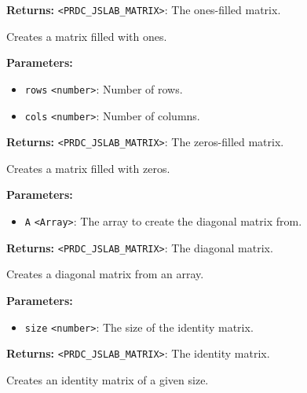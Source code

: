 \documentclass[12pt,a4paper]{article}
\begin{document}
\noindent \textbf{Returns:} \texttt{<PRDC\_JSLAB\_MATRIX>}: The ones-filled matrix.

\noindent Creates a matrix filled with ones.

\vspace{5mm}
\noindent {}


\noindent \textbf{Parameters:}
\begin{itemize}
  \item \texttt{rows} \texttt{<number>}: Number of rows.
  \item \texttt{cols} \texttt{<number>}: Number of columns.
\end{itemize}

\noindent \textbf{Returns:} \texttt{<PRDC\_JSLAB\_MATRIX>}: The zeros-filled matrix.

\noindent Creates a matrix filled with zeros.

\vspace{5mm}
\noindent {}


\noindent \textbf{Parameters:}
\begin{itemize}
  \item \texttt{A} \texttt{<Array>}: The array to create the diagonal matrix from.
\end{itemize}

\noindent \textbf{Returns:} \texttt{<PRDC\_JSLAB\_MATRIX>}: The diagonal matrix.

\noindent Creates a diagonal matrix from an array.

\vspace{5mm}
\noindent {}


\noindent \textbf{Parameters:}
\begin{itemize}
  \item \texttt{size} \texttt{<number>}: The size of the identity matrix.
\end{itemize}

\noindent \textbf{Returns:} \texttt{<PRDC\_JSLAB\_MATRIX>}: The identity matrix.

\noindent Creates an identity matrix of a given size.
\end{document}
